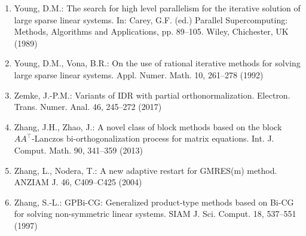 \begin{enumerate}[label=\arabic*.,ref=\arabic*,leftmargin=3em]
\item\label{bib:source-207}Young, D.M.: The search for high level parallelism for the iterative solution of large sparse linear systems. In: Carey, G.F. (ed.) Parallel Supercomputing: Methods, Algorithms and Applications, pp. 89–105. Wiley, Chichester, UK (1989)

\item\label{bib:source-208}Young, D.M., Vona, B.R.: On the use of rational iterative methods for solving large sparse linear systems. Appl. Numer. Math. 10, 261–278 (1992)

\item\label{bib:source-209}Zemke, J.-P.M.: Variants of IDR with partial orthonormalization. Electron. Trans. Numer. Anal. 46, 245–272 (2017)

\item\label{bib:source-210}Zhang, J.H., Zhao, J.: A novel class of block methods based on the block $AA^{\top}$-Lanczos bi-orthogonalization process for matrix equations. Int. J. Comput. Math. 90, 341–359 (2013)

\item\label{bib:source-211}Zhang, L., Nodera, T.: A new adaptive restart for GMRES(m) method. ANZIAM J. 46, C409–C425 (2004)

\item\label{bib:source-212}Zhang, S.-L.: GPBi-CG: Generalized product-type methods based on Bi-CG for solving non-symmetric linear systems. SIAM J. Sci. Comput. 18, 537–551 (1997)

\end{enumerate}
